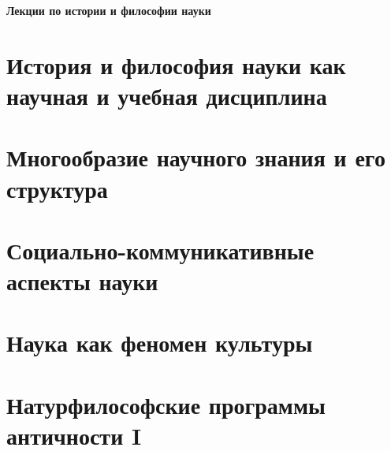 \documentclass[a4paper, 12pt, notitlepage]{report}
\begin{document}
\begin{titlepage}
    \centering
    \vspace*{9cm}
    {\Huge \textbf{Лекции по истории и философии науки}}
    \vfill
\end{titlepage}

\tableofcontents

\chapter{История и философия науки как научная и учебная дисциплина}


\chapter{Многообразие научного знания и его структура}


\chapter{Социально-коммуникативные аспекты науки}


\chapter{Наука как феномен культуры}


\chapter{Натурфилософские программы античности I}


%

%

%
\end{document}
